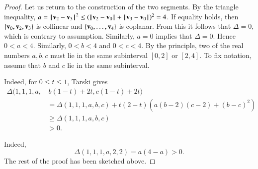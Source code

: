 \begin{proof}
Let us return to the construction of the two segments.  By the
triangle inequality, $a =\norm{\v_2}{\v_3}^2 \le
(\norm{\v_2}{\v_0}+\norm{\v_3}{\v_0})^2 = 4$.  If equality holds, then
$\{{\mathbf v}_0,{\mathbf v}_2,{\mathbf v}_3\}$ is collinear and $\{{\mathbf v}_0,\ldots,{\mathbf v}_4\}$ is
coplanar.  From this it follows that $\Delta=0$, which is contrary to
assumption.  Similarly, $a=0$ implies that $\Delta=0$.  Hence $0<a<4$.
Similarly, $0<b<4$ and $0<c<4$.  By the  
principle, two of the real numbers $a,b,c$ must lie in the same
subinterval $[0,2]$ or $[2,4]$.  To fix notation, assume that $b$ and
$c$ lie in the same subinterval.

  Indeed, for $0\le t \le 1$, Tarski
 gives
\begin{align*}
\Delta(1,1,1,a, &\,b(1-t)+2t,c(1-t)+2t)  \\
&= \Delta(1,1,1,a,b,c) + 
t (2-t) (a (b-2)(c-2) + (b-c)^2)\\
&\ge \Delta(1,1,1,a,b,c)\\
&> 0.
\end{align*}

  Indeed,
\[ \Delta(1,1,1,a,2,2) = a(4-a)>0.\]   
The rest of the proof has been sketched above.
\end{proof}
%






